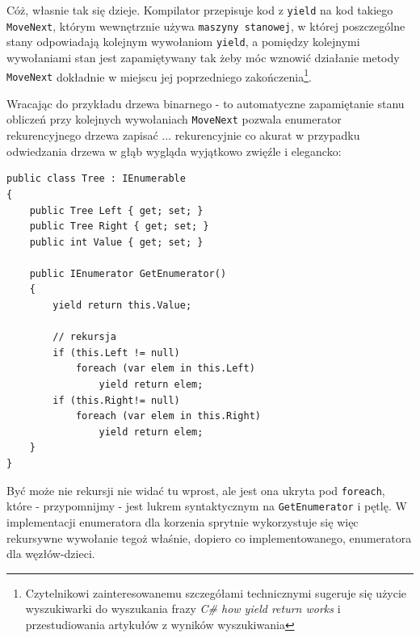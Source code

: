 Cóż, własnie tak się dzieje. Kompilator przepisuje kod z {\tt yield} na kod takiego {\tt MoveNext}, którym
wewnętrznie używa {\tt maszyny stanowej}, w której poszczególne stany odpowiadają kolejnym wywołaniom {\tt yield},
a pomiędzy kolejnymi wywołaniami stan jest zapamiętywany tak żeby móc wznowić działanie metody {\tt MoveNext} 
dokładnie w miejscu jej poprzedniego zakończenia\footnote{Czytelnikowi zainteresowanemu szczegółami technicznymi
sugeruje się użycie wyszukiwarki do wyszukania frazy {\em C\# how yield return works} i przestudiowania artykułów z wyników
wyszukiwania}.

Wracając do przykładu drzewa binarnego - to automatyczne zapamiętanie stanu obliczeń przy kolejnych wywołaniach
{\tt MoveNext} pozwala enumerator rekurencyjnego drzewa zapisać ... rekurencyjnie co akurat w przypadku
odwiedzania drzewa w głąb wygląda wyjątkowo zwięźle i elegancko:

\begin{scriptsize}
\begin{verbatim}
public class Tree : IEnumerable
{       
    public Tree Left { get; set; }
    public Tree Right { get; set; }
    public int Value { get; set; }

    public IEnumerator GetEnumerator()
    {
        yield return this.Value;

        // rekursja
        if (this.Left != null)
            foreach (var elem in this.Left)
                yield return elem;
        if (this.Right!= null)
            foreach (var elem in this.Right)
                yield return elem;
    }
}
\end{verbatim}
\end{scriptsize}

Być może nie rekursji nie widać tu wprost, ale jest ona ukryta pod {\tt foreach}, które - przypomnijmy - 
jest lukrem syntaktycznym na {\tt GetEnumerator} i pętlę. W implementacji enumeratora dla korzenia
sprytnie wykorzystuje się więc rekursywne wywołanie tegoż właśnie, dopiero co implementowanego, enumeratora
dla węzłów-dzieci.